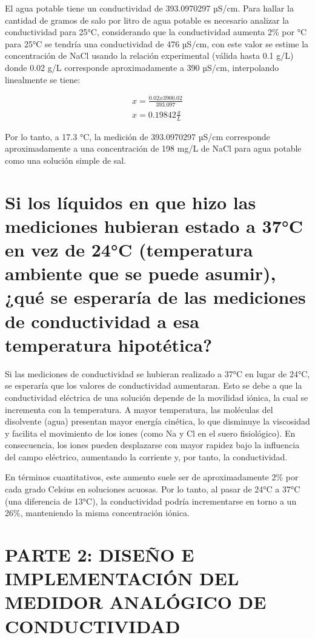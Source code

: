 \documentclass[a4paper,openany,12pt]{book}
\begin{document}
El agua potable tiene un conductividad de 393.0970297 µS/cm. Para hallar la cantidad de gramos de salo por litro de agua potable es necesario analizar la conductividad para 25°C, considerando que la conductividad aumenta 2\% por °C para 25°C se tendría una conductividad de 476 µS/cm, con este valor se estime la concentración de NaCl usando la relación experimental (válida hasta 0.1 g/L) donde 0.02 g/L corresponde aproximadamente a 390 µS/cm, interpolando linealmente se tiene:

\begin{align}
	x = \frac{0.02x3900.02}{393.097}\\
	x = 0.19842 \frac{g}{L}
\end{align}

Por lo tanto, a 17.3 °C, la medición de 393.0970297 µS/cm corresponde aproximadamente a una concentración de 198 mg/L de NaCl para agua potable como una solución simple de sal.


\section{Si los líquidos en que hizo las mediciones hubieran estado a 37°C en vez de 24°C (temperatura ambiente que se puede asumir), ¿qué se esperaría de las mediciones de conductividad a esa temperatura hipotética?}


Si las mediciones de conductividad se hubieran realizado a 37°C en lugar de 24°C, se esperaría que los valores de conductividad aumentaran. Esto se debe a que la conductividad eléctrica de una solución depende de la movilidad iónica, la cual se incrementa con la temperatura. A mayor temperatura, las moléculas del disolvente (agua) presentan mayor energía cinética, lo que disminuye la viscosidad y facilita el movimiento de los iones (como Na y Cl en el suero fisiológico). En consecuencia, los iones pueden desplazarse con mayor rapidez bajo la influencia del campo eléctrico, aumentando la corriente y, por tanto, la conductividad.

En términos cuantitativos, este aumento suele ser de aproximadamente 2\% por cada grado Celsius en soluciones acuosas. Por lo tanto, al pasar de 24°C a 37°C (una diferencia de 13°C), la conductividad podría incrementarse en torno a un 26\%, manteniendo la misma concentración iónica.




\section{PARTE 2: DISEÑO E IMPLEMENTACIÓN DEL MEDIDOR ANALÓGICO DE CONDUCTIVIDAD}
\end{document}
